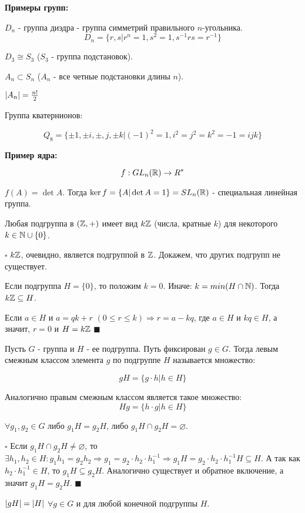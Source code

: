 \documentclass[../main.tex]{subfiles}
\begin{document}
\void
\textbf{Примеры групп:}

 $D_n$ - группа диэдра - группа симметрий правильного $n$-угольника.
$$D_n = \{r, s\vert r^n = 1, s^2 = 1, s^{-1}rs = r^{-1}\}$$

 $D_3\cong S_3$ ($S_3$ - группа подстановок).

\void
{} $A_n\subset S_n $ ($A_n$ - все четные подстановки длины $n$).

$\vert A_n\vert = \frac{n!}{2}$

\void
{} Группа кватернионов:

$$Q_8 = \{\pm 1,\pm i,\pm, j,\pm k\vert (-1)^2 = 1, i^2 = j^2 = k^2 = -1 = ijk\}$$

\void
\textbf{Пример ядра:}

$$f: GL_n(\mathbb{R})\rightarrow R^*$$

$f(A) = \det{A}$. Тогда $\ker f = \{A\vert \det{A} = 1\} = SL_n(\mathbb{R})$ - специальная линейная группа.

\void
{} Любая подгруппа в $(\mathbb{Z}, +)$ имеет вид $k\mathbb{Z}$ (числа, кратные $k$) для некоторого $k\in \mathbb{N}\cup\{0\}$.

\void
$\square$ $k\mathbb{Z}$, очевидно, является подгруппой в $\mathbb{Z}$. Докажем, что других подгрупп не существует.

Если подгруппа $H = \{0\}$, то положим $k = 0$. Иначе: $k = min(H\cap\mathbb{N})$. Тогда $k\mathbb{Z}\subseteq H$.

Если $a\in H$ и $a = qk + r$ $(0\leq r\le k) \Rightarrow r = a - kq$, где $a\in H$ и $kq\in H$, а значит,
$r = 0$ и $H = k\mathbb{Z}$ $\blacksquare$

\void
{} Пусть $G$ - группа и $H$ - ее подгруппа. Путь фиксирован $g\in G$. Тогда левым смежным классом
элемента $g$ по подгруппе $H$ называется множество:

$$ gH = \{g\cdot h\vert h\in H\} $$

Аналогично правым смежным классом является такое множество:
$$ Hg = \{h\cdot g\vert h\in H\} $$

\void
{} $\forall g_1, g_2\in G$ либо $g_1H = g_2H$, либо $g_1H\cap g_2H = \varnothing$.

\void
$\square$ Если $g_1H\cap g_2H\neq\varnothing$, то $\exists h_1,h_2\in H: g_1h_1 = g_2h_2\Rightarrow
g_1 = g_2\cdot h_2\cdot h_1^{-1} \Rightarrow g_1H = g_2\cdot h_2\cdot h_1^{-1}H\subseteq H$.
А так как $h_2\cdot h_1^{-1}\in H$, то $g_1H\subseteq g_2H$. Аналогично существует
и обратное включение, а значит $g_1H = g_2H$. $\blacksquare$

\void
{} $\vert gH\vert = \vert H\vert$ $\forall g\in G$ и для любой конечной подгруппы $H$.
\end{document}
